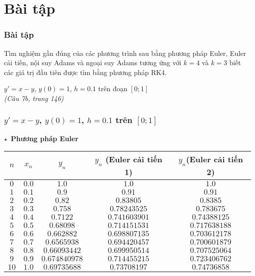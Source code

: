 \section{Bài tập}
\begin{frame}
	\frametitle{Bài tập}
	Tìm nghiệm gần đúng của các phương trình sau bằng phương pháp Euler, Euler cải tiến, nội suy Adams và ngoại suy Adams tương ứng với $k=4$ và $k=3$ biết các giá trị đầu tiên được tìm bằng phương pháp RK4.\par
	$y'=x-y$, $y(0)=1$, $h=0.1$ trên đoạn $[0;1]$ \\
	\textit{(Câu 7b, trang 146)}\par
\end{frame}

\begin{frame}
	\frametitle{$y'=x-y$, $y(0)=1$, $h=0.1$ trên $[0;1]$}
	$\star$~\textbf{Phương pháp Euler}
	\begin{table}\footnotesize\begin{tabular}{|c|c|c|c|c|}\hline
		$n$ & $x_n$ & $y_n$ & $y_n$ (Euler cải tiến 1) & $y_n$(Euler cải tiến 2) \\ \hline
		$0$ & $0.0$ & $1.0$ & $1.0$ & $1.0$ \\ \hline
		$1$ & $0.1$ & $0.9$ & $0.91$ & $0.91$ \\ \hline
		$2$ & $0.2$ & $0.82$ & $0.83805$ & $0.8385$ \\ \hline
		$3$ & $0.3$ & $0.758$ & $0.78243525$ & $0.783675$ \\ \hline
		$4$ & $0.4$ & $0.7122$ & $0.741603901$ & $0.74388125$ \\ \hline
		$5$ & $0.5$ & $0.68098$ & $0.714151531$ & $0.717638188$ \\ \hline
		$6$ & $0.6$ & $0.662882$ & $0.698807135$ & $0.703612178$ \\ \hline
		$7$ & $0.7$ & $0.6565938$ & $0.694420457$ & $0.700601879$ \\ \hline
		$8$ & $0.8$ & $0.66093442$ & $0.699950514$ & $0.707525064$ \\ \hline
		$9$ & $0.9$ & $0.674840978$ & $0.714455215$ & $0.723406762$ \\ \hline
		$10$ & $1.0$ & $0.69735688$ & $0.73708197$ & $0.74736858$ \\ \hline
	\end{tabular}\end{table}
\end{frame}

